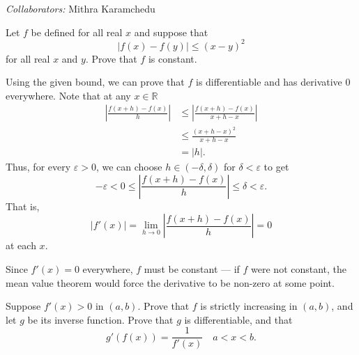 \documentclass[12 pt, letterpaper]{hmcpset}
\begin{document}
\emph{Collaborators:} Mithra Karamchedu

\begin{problem}
	Let $f$ be defined for all real $x$ and suppose that
	\[
		\lvert f(x) - f(y) \rvert \le (x - y)^{2}
	\]
	for all real $x$ and $y$. Prove that $f$ is constant.
\end{problem}

\begin{solution}
	Using the given bound, we can prove that $f$ is differentiable and has derivative $0$ everywhere. Note that at any $x \in \mathbb{R}$
	\begin{align*}
		\left \lvert \frac{f(x + h) - f(x)}{h} \right \rvert & \le \left \lvert \frac{f(x + h) - f(x)}{x + h - x} \right \rvert \\
								     & \le \frac{(x + h - x)^{2}}{x + h - x} \\
		& = \lvert h \rvert.
	\end{align*}
	Thus, for every $\varepsilon > 0$, we can choose $h \in (-\delta, \delta)$ for $\delta < \varepsilon$ to get
	\[
		-\varepsilon < 0 \le \left \lvert \frac{f(x + h) - f(x)}{h} \right \rvert \le \delta < \varepsilon.
	\]
	That is,
	\[
		\lvert f'(x) \rvert = \lim_{h \to 0} \left \lvert \frac{f(x + h) - f(x)}{h} \right \rvert = 0
	\]
	at each $x$.

	Since $f'(x) = 0$ everywhere, $f$ must be constant --- if $f$ were not constant, the mean value theorem would force the derivative to be non-zero at some point. 
\end{solution}

\pagebreak

\begin{problem}
	Suppose $f'(x) > 0$ in $(a, b)$. Prove that $f$ is strictly increasing in $(a, b)$, and let $g$ be its inverse function. Prove that $g$ is differentiable, and that
	\[
		g'(f(x)) = \frac{1}{f'(x)} \quad a < x < b.
	\]
\end{problem}
\end{document}
